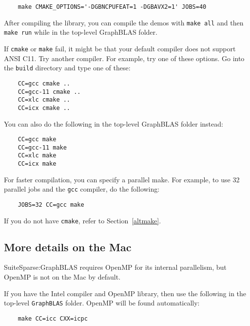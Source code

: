 \documentclass[12pt]{article}
\begin{document}
{    {\small
    \begin{verbatim}
    make CMAKE_OPTIONS='-DGBNCPUFEAT=1 -DGBAVX2=1' JOBS=40 \end{verbatim} }

After compiling the library, you can compile the demos with
\verb'make all' and then \verb'make run' while in the top-level
GraphBLAS folder.

If \verb'cmake' or \verb'make' fail, it might be that your default compiler
does not support ANSI C11.  Try another compiler.  For example, try one of
these options.  Go into the \verb'build' directory and type one of these:

    {\small
    \begin{verbatim}
    CC=gcc cmake ..
    CC=gcc-11 cmake ..
    CC=xlc cmake ..
    CC=icx cmake ..  \end{verbatim} }

You can also do the following in the top-level GraphBLAS folder instead:

    {\small
    \begin{verbatim}
    CC=gcc make
    CC=gcc-11 make
    CC=xlc make
    CC=icx make \end{verbatim} }

For faster compilation, you can specify a parallel make.  For example,
to use 32 parallel jobs and the \verb'gcc' compiler, do the following:

    {\small
    \begin{verbatim}
    JOBS=32 CC=gcc make \end{verbatim} }

If you do not have \verb'cmake', refer to Section~\ref{altmake}.

\subsection{More details on the Mac}

SuiteSparse:GraphBLAS requires OpenMP for its internal parallelism, but
OpenMP is not on the Mac by default.

If you have the Intel compiler and OpenMP library, then use the following
in the top-level \verb'GraphBLAS' folder.  OpenMP will be found automatically:

    {\small
    \begin{verbatim}
    make CC=icc CXX=icpc \end{verbatim} }

}
\end{document}
